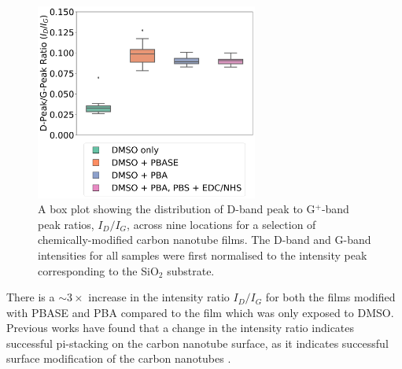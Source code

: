 \documentclass[
  a4paper,
]{scrbook}
\begin{document}
\begin{figure}

{\centering \includegraphics[width=0.65\textwidth,height=\textheight]{figures/ch6/comparison_raman.png}

}

\caption[A box plot showing the distribution of D-band peak to
G\(^+\)-band peak ratios, \(I_D/I_G\), across nine locations for a
selection of chemically-modified carbon nanotube
films.]{\label{fig-linker-raman}A box plot showing the distribution of
D-band peak to G\(^+\)-band peak ratios, \(I_D/I_G\), across nine
locations for a selection of chemically-modified carbon nanotube films.
The D-band and G-band intensities for all samples were first normalised
to the intensity peak corresponding to the SiO\(_2\) substrate.}

\end{figure}

There is a \(\sim 3 \times\) increase in the intensity ratio \(I_D/I_G\)
for both the films modified with PBASE and PBA compared to the film
which was only exposed to DMSO. Previous works have found that a change
in the intensity ratio indicates successful pi-stacking on the carbon
nanotube surface, as it indicates successful surface modification of the
carbon nanotubes \autocite{Wei2010,Lan2013}.
\end{document}
